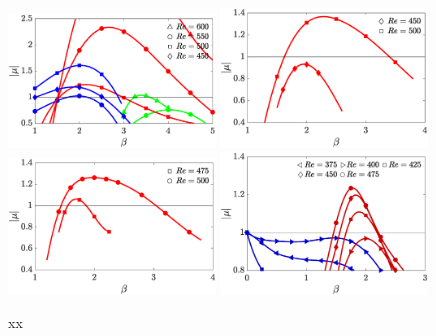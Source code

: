 \begin{figure}
  \centering
  \includegraphics[width=0.49\textwidth]{./fig/AR5s/multipliers_AR5p5.eps}
  \includegraphics[width=0.49\textwidth]{./fig/AR7s/multipliers_AR6.eps}  
  \includegraphics[width=0.49\textwidth]{./fig/AR7s/multipliers_AR7.eps}
  \includegraphics[width=0.49\textwidth]{./fig/AR9s/multipliers.eps}
  \caption{xx}
  \label{fig:multipliers_long}
\end{figure}

